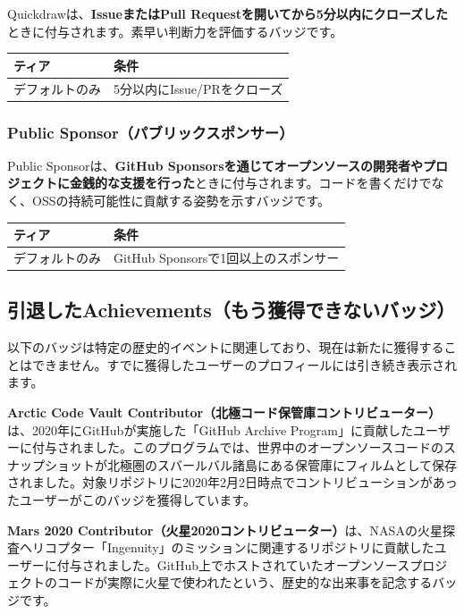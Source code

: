 Quickdrawは、\textbf{IssueまたはPull Requestを開いてから5分以内にクローズした}ときに付与されます。素早い判断力を評価するバッジです。

\begin{table}[htbp]
\centering
\begin{tabular}{ll}
\hline
\textbf{ティア} & \textbf{条件} \\
\hline
デフォルトのみ & 5分以内にIssue/PRをクローズ \\
\hline
\end{tabular}
\end{table}

\subsubsection{Public Sponsor（パブリックスポンサー）}

Public Sponsorは、\textbf{GitHub Sponsorsを通じてオープンソースの開発者やプロジェクトに金銭的な支援を行った}ときに付与されます。コードを書くだけでなく、OSSの持続可能性に貢献する姿勢を示すバッジです。

\begin{table}[htbp]
\centering
\begin{tabular}{ll}
\hline
\textbf{ティア} & \textbf{条件} \\
\hline
デフォルトのみ & GitHub Sponsorsで1回以上のスポンサー \\
\hline
\end{tabular}
\end{table}

\subsection{引退したAchievements（もう獲得できないバッジ）}

以下のバッジは特定の歴史的イベントに関連しており、現在は新たに獲得することはできません。すでに獲得したユーザーのプロフィールには引き続き表示されます。

\textbf{Arctic Code Vault Contributor（北極コード保管庫コントリビューター）}は、2020年にGitHubが実施した「GitHub Archive Program」に貢献したユーザーに付与されました。このプログラムでは、世界中のオープンソースコードのスナップショットが北極圏のスバールバル諸島にある保管庫にフィルムとして保存されました。対象リポジトリに2020年2月2日時点でコントリビューションがあったユーザーがこのバッジを獲得しています。

\textbf{Mars 2020 Contributor（火星2020コントリビューター）}は、NASAの火星探査ヘリコプター「Ingenuity」のミッションに関連するリポジトリに貢献したユーザーに付与されました。GitHub上でホストされていたオープンソースプロジェクトのコードが実際に火星で使われたという、歴史的な出来事を記念するバッジです。

